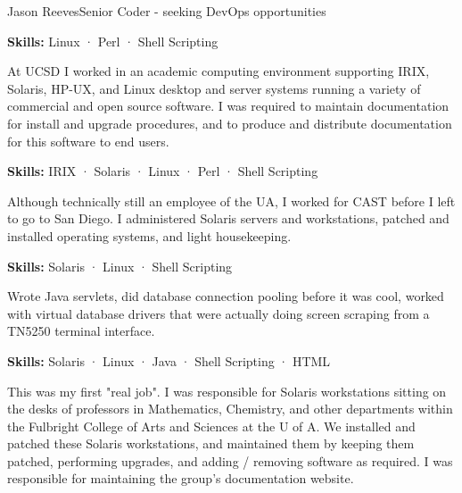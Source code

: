 \documentclass{article}
\begin{document}
\begin{cv}[avatar]{Jason Reeves}{Senior Coder - seeking DevOps opportunities}
\begin{cvevent}[Mar 2000][May 2000]
  \textbf{Skills:} Linux · Perl · Shell Scripting
  \vspace*{5mm}
\end{cvevent}

\begin{cvevent}[Nov 1999][Mar 2000]
  At UCSD I worked in an academic computing environment supporting IRIX, Solaris, HP-UX, and Linux desktop and server systems running a variety of commercial and open source software.  I was required to maintain documentation for install and upgrade procedures, and to produce and distribute documentation for this software to end users.
  \vspace*{3mm}
  
  \textbf{Skills:} IRIX · Solaris · Linux · Perl · Shell Scripting
  \vspace*{5mm}
\end{cvevent}

\begin{cvevent}[Jan 1998][Nov 1999]
  Although technically still an employee of the UA, I worked for CAST before I left to go to San Diego. I administered Solaris servers and workstations, patched and installed operating systems, and light housekeeping.
  \vspace*{3mm}
  
  \textbf{Skills:} Solaris · Linux · Shell Scripting
  \vspace*{5mm}
\end{cvevent}

\begin{cvevent}[Jan 1997][Nov 1998]
  Wrote Java servlets, did database connection pooling before it was cool, worked with virtual database drivers that were actually doing screen scraping from a TN5250 terminal interface.
  \vspace*{3mm}
  
  \textbf{Skills:} Solaris · Linux · Java · Shell Scripting · HTML
  \vspace*{5mm}
\end{cvevent}

\begin{cvevent}[Nov 1995][Jan 1997]
  This was my first "real job". I was responsible for Solaris workstations sitting on the desks of professors in Mathematics, Chemistry, and other departments within the Fulbright College of Arts and Sciences at the U of A. We installed and patched these Solaris workstations, and maintained them by keeping them patched, performing upgrades, and adding / removing software as required. I was responsible for maintaining the group's documentation website.
  \vspace*{3mm}
  

\end{cvevent}
\end{cv}
\end{document}
